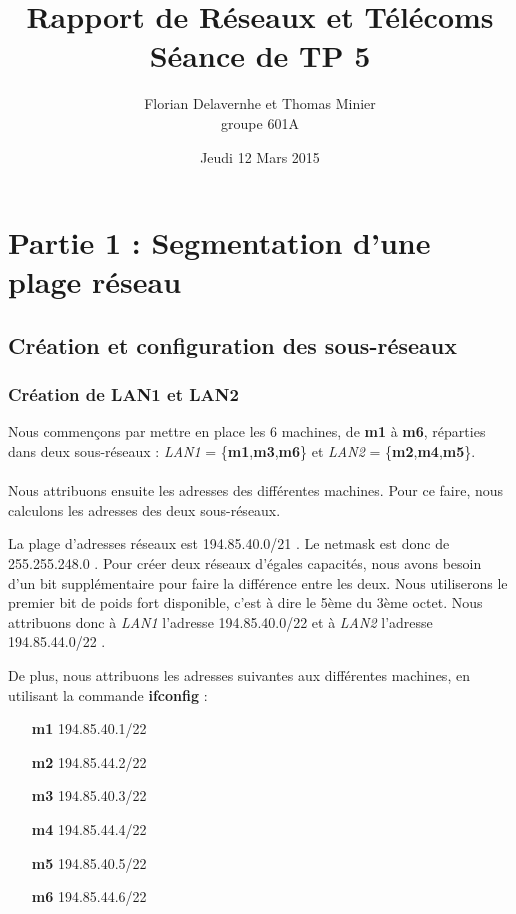\documentclass{article}
\title{Rapport de Réseaux et Télécoms \\ Séance de TP 5}
\author{Florian Delavernhe et Thomas Minier \\ groupe 601A}
\date{Jeudi 12 Mars 2015}
\begin{document}
\maketitle
\vspace{5cm}
\tableofcontents
\newpage

\section{Partie 1 : Segmentation d'une plage réseau}

\subsection{Création et configuration des sous-réseaux}

\subsubsection{Création de LAN1 et LAN2}

Nous commençons par mettre en place les 6 machines, de \textbf{m1} à \textbf{m6}, réparties dans deux sous-réseaux : \textit{LAN1} = \{\textbf{m1},\textbf{m3},\textbf{m6}\} et \textit{LAN2} = \{\textbf{m2},\textbf{m4},\textbf{m5}\}. \\
\paragraph{}{
Nous attribuons ensuite les adresses des différentes machines. Pour ce faire, nous calculons les adresses des deux sous-réseaux.

La plage d'adresses réseaux est 194.85.40.0/21 . Le netmask est donc de 255.255.248.0 . Pour créer deux réseaux d'égales capacités, nous avons besoin d'un bit supplémentaire pour faire la différence entre les deux. Nous utiliserons le premier bit de poids fort disponible, c'est à dire le 5ème du 3ème octet. Nous attribuons donc à \textit{LAN1} l'adresse 194.85.40.0/22 et à \textit{LAN2} l'adresse 194.85.44.0/22 .

De plus, nous attribuons les adresses suivantes aux différentes machines, en utilisant la commande \textbf{ifconfig} :
\begin{itemize}
\item[\textbf{m1}] 194.85.40.1/22
\item[\textbf{m2}] 194.85.44.2/22
\item[\textbf{m3}] 194.85.40.3/22
\item[\textbf{m4}] 194.85.44.4/22
\item[\textbf{m5}] 194.85.40.5/22
\item[\textbf{m6}] 194.85.44.6/22
\end{itemize}}
\end{document}
